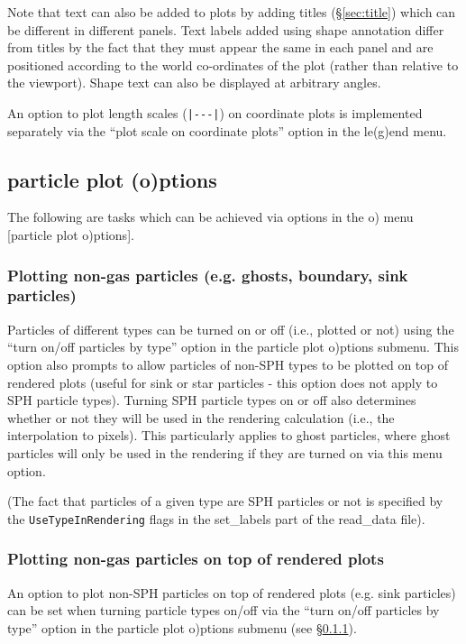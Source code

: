 \documentclass[a4paper,10pt]{article}
\begin{document}
 Note that text can also be added to plots by adding titles (\S\ref{sec:title}) which can be different in different panels. Text labels added using shape annotation differ from titles by the fact that they must appear the same in each panel and are positioned according to the world co-ordinates of the plot (rather than relative to the viewport). Shape text can also be displayed at arbitrary angles.
 
 An option to plot length scales (\verb+|---|+) on coordinate plots is implemented separately via the ``plot scale on coordinate plots'' option in the le(g)end menu.
 
\subsection{particle plot (o)ptions}
\label{sec:opts}
 The following are tasks which can be achieved via options in the o) menu [particle plot o)ptions].
 
\subsubsection{ Plotting non-gas particles (e.g. ghosts, boundary, sink particles)}
\label{sec:plotparticlesbytype}
 Particles of different types can be turned on or off (i.e., plotted or not) using the ``turn on/off particles by type'' option in the particle plot o)ptions submenu. This option also prompts to allow particles of non-SPH types to be
plotted on top of rendered plots (useful for sink or star particles - this option does not apply to SPH particle types).  Turning SPH particle types on or off also determines whether or not they will be used in the rendering calculation (i.e., the interpolation to pixels). This particularly applies to ghost particles, where ghost particles will only be used in the rendering if they are turned on via this menu option.

 (The fact that particles of a given type are SPH particles or not is specified by the \verb+UseTypeInRendering+
flags in the set\_labels part of the read\_data file).

\subsubsection{ Plotting non-gas particles on top of rendered plots}
 An option to plot non-SPH particles on top of rendered plots (e.g. sink particles) can be set when turning particle types on/off via the ``turn on/off particles by type'' option in the particle plot o)ptions submenu (see \S\ref{sec:plotparticlesbytype}).
\end{document}
